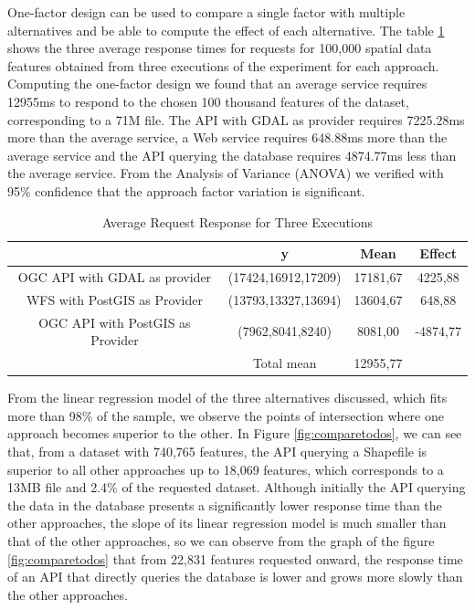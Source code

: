 One-factor design can be used to compare a single factor with multiple alternatives and be able to compute the effect of each alternative. The table \ref{tab:onefactor} shows the three average response times for requests for 100,000 spatial data features obtained from three executions of the experiment for each approach. Computing the one-factor design we found that an average service requires 12955ms to respond to the chosen 100 thousand features of the dataset, corresponding to a 71M file. The API with GDAL as provider requires 7225.28ms more than the average service, a Web service requires 648.88ms more than the average service and the API querying the database requires 4874.77ms less than the average service. From the Analysis of Variance (ANOVA) we verified with 95\% confidence that the approach factor variation is significant.

\begin{table}[H]
\centering
\caption{Average Request Response for Three Executions }
\label{tab:onefactor}
\begin{tabular}{cc|c|c}
\cline{2-4}
\multicolumn{1}{l|}{}                                     & y                   & Mean     & \multicolumn{1}{c|}{Effect}  \\ \hline
\multicolumn{1}{|c|}{OGC API with GDAL as provider}       & (17424,16912,17209) & 17181,67 & \multicolumn{1}{c|}{4225,88} \\ \hline
\multicolumn{1}{|c|}{WFS with PostGIS as Provider} & (13793,13327,13694) & 13604,67 & \multicolumn{1}{c|}{648,88} \\ \hline
\multicolumn{1}{|c|}{OGC API with PostGIS as Provider} & (7962,8041,8240)    & 8081,00  & \multicolumn{1}{c|}{-4874,77}  \\ \hline
\multicolumn{1}{l}{}                                      & Total mean          & 12955,77 & \multicolumn{1}{l}{}         \\ \cline{3-3}
\end{tabular}
\end{table}

 From the linear regression model of the three alternatives discussed, which fits more than 98\% of the sample, %
 we observe the points of intersection where one approach becomes superior to the other. In Figure \ref{fig:comparetodos}, we can see that, from a dataset with 740,765 features, the API querying a Shapefile is superior to all other approaches up to 18,069 features, which corresponds to a 13MB file and 2.4\% of the requested dataset. Although initially the API querying the data in the database presents a significantly lower response time than the other approaches, the slope of its linear regression model is much smaller than that of the other approaches, so we can observe from the graph of the figure \ref{fig:comparetodos} that from 22,831 features requested onward, the response time of an API that directly queries the database is lower and grows more slowly than the other approaches.

